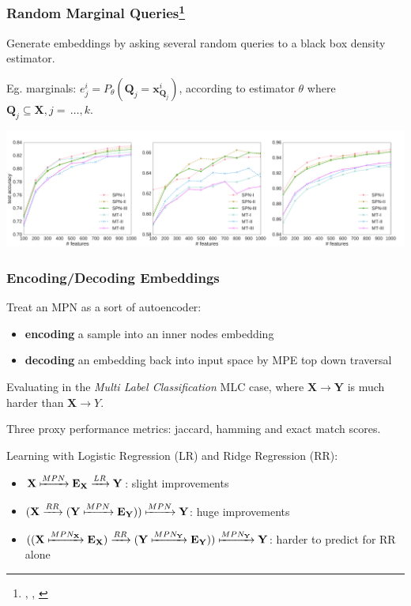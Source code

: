 \documentclass[10pt, t, xcolor={usenames,dvipsnames,svgnames}, compress]{beamer}
\newcommand{\customcite}[1]{\footnote{\scriptsize \citeauthor{#1}, \citetitle{#1}, \citeyear{#1}}}
\begin{document}
\begin{frame}
  \frametitle{Random Marginal Queries\customcite{Vergari2016a}}
  Generate embeddings by asking several random queries to a black box
  density estimator.\par
  Eg. marginals: $e^{i}_{j}=P_{\theta}(\mathbf{Q}_{j}=\mathbf{x}^{i}_{\mathbf{Q}_{j}})$,
  according to estimator $\theta$ where $\mathbf{Q}_{j}\subseteq\mathbf{X}, j=\,\dots,k$.
  \begin{center}
    \includegraphics[width=1.0\linewidth]{figures/lines-wide}
  \end{center}
  
\end{frame}

\begin{frame}
  \frametitle{Encoding/Decoding Embeddings}
  Treat an MPN as a sort of autoencoder:
  \begin{itemize}
  \item \textbf{encoding} a sample into an inner nodes embedding
     \item \textbf{decoding} an embedding back into input space by MPE top
      down traversal
  \end{itemize}


  Evaluating in the \emph{Multi Label Classification} MLC case, where
  $\mathbf{X}\rightarrow\mathbf{Y}$ is much harder than
  $\mathbf{X}\rightarrow Y$.\par
  Three proxy performance metrics: jaccard, hamming and exact match
  scores.\par
  Learning with Logistic Regression (LR)
  and Ridge Regression (RR):
  \begin{itemize}
  \item $\mathbf{X}
    \xmapsto{MPN}\mathbf{E}_{\mathbf{X}}\xrightarrow{LR}\mathbf{Y}$:
    slight improvements
  \item
    $(\mathbf{X}\xrightarrow{RR}(\mathbf{Y}\xmapsto{MPN}\mathbf{E}_{\mathbf{Y}}))\xmapsto{MPN}\mathbf{Y}$:
    huge improvements
  \item
    $((\mathbf{X}\xmapsto{MPN_{\mathbf{X}}}\mathbf{E}_{\mathbf{X}})\xrightarrow{RR}(\mathbf{Y}\xmapsto{MPN_{\mathbf{Y}}}\mathbf{E}_{\mathbf{Y}}))\xmapsto{MPN_{\mathbf{Y}}}\mathbf{Y}$:
    harder to predict for RR alone
  \end{itemize}
\end{frame}
\end{document}
